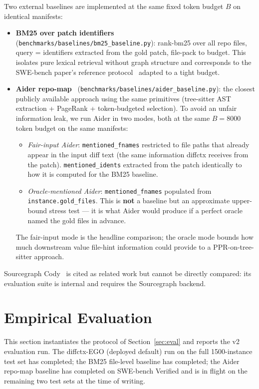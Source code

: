 \documentclass[11pt, a4paper]{article}
\begin{document}
Two external baselines are implemented at the same fixed token budget $B$ on identical manifests:
\begin{itemize}
    \item \textbf{BM25 over patch identifiers} (\texttt{benchmarks/baselines/bm25\_baseline.py}): rank-bm25 over all repo files, query = identifiers extracted from the gold patch, file-pack to budget. This isolates pure lexical retrieval without graph structure and corresponds to the SWE-bench paper's reference protocol~\cite{jimenez2024swebench} adapted to a tight budget.
    \item \textbf{Aider repo-map}~\cite{aider2023repomap} (\texttt{benchmarks/baselines/aider\_baseline.py}): the closest publicly available approach using the same primitives (tree-sitter AST extraction + PageRank + token-budgeted selection). To avoid an unfair information leak, we run Aider in two modes, both at the same $B{=}8000$ token budget on the same manifests:
    \begin{itemize}
        \item \emph{Fair-input Aider}: \texttt{mentioned\_fnames} restricted to file paths that already appear in the input diff text (the same information diffctx receives from the patch). \texttt{mentioned\_idents} extracted from the patch identically to how it is computed for the BM25 baseline.
        \item \emph{Oracle-mentioned Aider}: \texttt{mentioned\_fnames} populated from \texttt{instance.gold\_files}. This is \textbf{not} a baseline but an approximate upper-bound stress test --- it is what Aider would produce if a perfect oracle named the gold files in advance.
    \end{itemize}
    The fair-input mode is the headline comparison; the oracle mode bounds how much downstream value file-hint information could provide to a PPR-on-tree-sitter approach.
\end{itemize}
Sourcegraph Cody~\cite{hartman2024recsys} is cited as related work but cannot be directly compared: its evaluation suite is internal and requires the Sourcegraph backend.

\newpage
\section{Empirical Evaluation}
\label{sec:prelim-results}

This section instantiates the protocol of Section~\ref{sec:eval} and reports the v2 evaluation run. The diffctx-EGO (deployed default) run on the full 1500-instance test set has completed; the BM25 file-level baseline has completed; the Aider repo-map baseline has completed on SWE-bench Verified and is in flight on the remaining two test sets at the time of writing.
\end{document}
